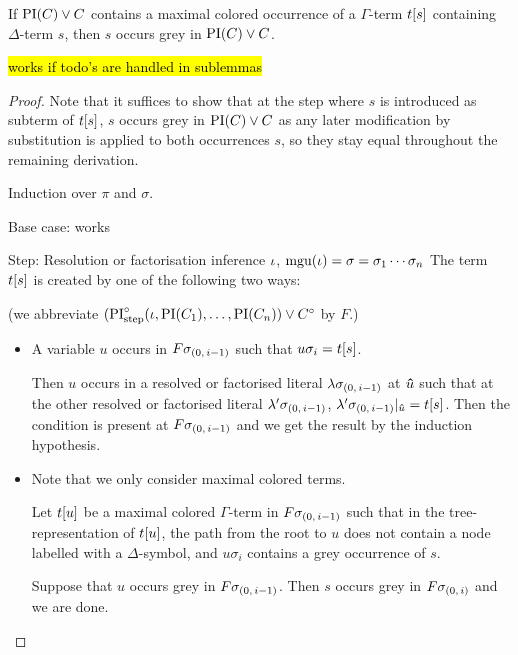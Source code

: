 \documentclass[,%
	draft=false,%
	numbers=noendperiod
	12pt,
	a4paper,
	oneside,%
	openany,
]{memoir}
\begin{document}
\nopagebreak
\begin{lemma}
	If ${\operatorname{PI}(C) \lor C}$ contains a maximal colored occurrence of a $\Gamma$-term $t[s]$ containing $\Delta$-term $s$, then 
	$s$ occurs grey in $\operatorname{PI}(C) \lor C$.
\end{lemma}
\hl{works if todo's are handled in sublemmas}
\begin{proof}
	Note that it suffices to show that at the step where $s$ is introduced as subterm of $t[s]$, $s$ occurs grey in $\operatorname{PI}(C) \lor C$ as any later modification by substitution is applied to both occurrences $s$, so they stay equal throughout the remaining derivation. 
	\medskip

	\noindent
	Induction over $\pi$ and $\sigma$.
	\medskip

	\noindent
	Base case: works
	\medskip

	\noindent
	Step:
	Resolution or factorisation inference $\iota$, $\operatorname{mgu}(\iota) = \sigma = \sigma_1\cdots\sigma_n$ 
	The term $t[s]$ is created by one of the following two ways: 

	(we abbreviate 
	$(\operatorname{PI}^\circ_{\mathrm{step}}(\iota, \operatorname{PI}(C_1), \dots, \operatorname{PI}(C_n)) \lor C^\circ$ by $F$.)
	\begin{itemize}
		\item
			A variable $u$ occurs in $F\sigma_{(0,\,i-1)}$ such that $u\sigma_i = t[s]$.

			Then $u$ occurs in a resolved or factorised literal $\lambda\sigma_{(0,\,i-1)}$ at $\bm\hat u$ such that at the other resolved or factorised literal $\lambda'\sigma_{(0,\,i-1)}$, $\lambda'\sigma_{(0,\,i-1)}|_{\bm\hat u} = t[s]$.
			Then the condition is present at $F\sigma_{(0,\,i-1)}$ and we get the result by the induction hypothesis. 

		\item 
			Note that we only consider maximal colored terms.
			
			Let $t[u]$ be a maximal colored $\Gamma$-term in $F\sigma_{(0,\,i-1)}$ such that in the tree-representation of $t[u]$, the path from the root to $u$ does not contain a node labelled with a $\Delta$-symbol, and $u\sigma_i$ contains a grey occurrence of $s$.


			Suppose that $u$ occurs grey in $F\sigma_{(0,\,i-1)}$.
			Then $s$ occurs grey in $F\sigma_{(0,\,i)}$ and we are done.


\end{itemize}
\end{proof}
\end{document}
